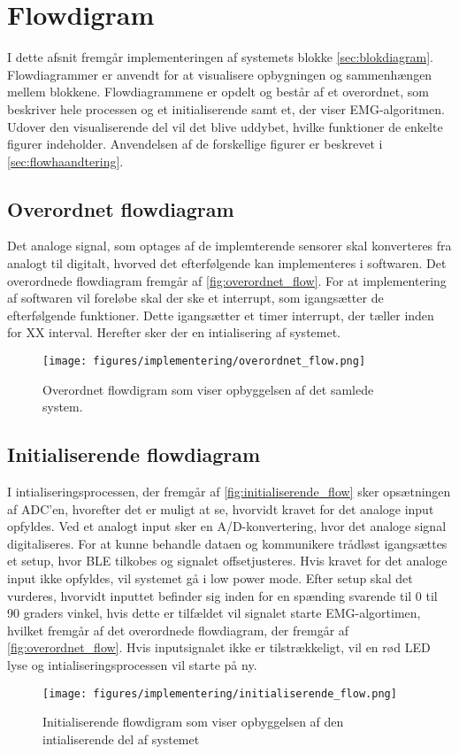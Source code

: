\section{Flowdigram}
I dette afsnit fremgår implementeringen af systemets blokke \autoref{sec:blokdiagram}. Flowdiagrammer er anvendt for at visualisere opbygningen og sammenhængen mellem blokkene. Flowdiagrammene er opdelt og består af et overordnet, som beskriver hele processen og et initialiserende samt et, der viser EMG-algoritmen. Udover den visualiserende del vil det blive uddybet, hvilke funktioner de enkelte figurer indeholder. Anvendelsen af de forskellige figurer er beskrevet i \autoref{sec:flowhaandtering}.

\subsection{Overordnet flowdiagram}
Det analoge signal, som optages af de implemterende sensorer skal konverteres fra analogt til digitalt, hvorved det efterfølgende kan implementeres i softwaren. Det overordnede flowdiagram fremgår af \autoref{fig:overordnet_flow}. For at implementering af softwaren vil foreløbe skal der ske et interrupt, som igangsætter de efterfølgende funktioner. Dette igangsætter et timer interrupt, der tæller inden for XX interval. Herefter sker der en intialisering af systemet.

\begin{figure}[H]
\centering
\texttt{[image: figures/implementering/overordnet\_flow.png]}
\caption{Overordnet flowdigram som viser opbyggelsen af det samlede system.}
\label{fig:overordnet_flow}
\end{figure}


\subsection{Initialiserende flowdiagram}
I intialiseringsprocessen, der fremgår af \autoref{fig:initialiserende_flow} sker opsætningen af ADC'en, hvorefter det er muligt at se, hvorvidt kravet for det analoge input opfyldes. Ved et analogt input sker en A/D-konvertering, hvor det analoge signal digitaliseres. For at kunne behandle dataen og kommunikere trådløst igangsættes et setup, hvor BLE tilkobes og signalet offsetjusteres. Hvis kravet for det analoge input ikke opfyldes, vil systemet gå i low power mode. Efter setup skal det vurderes, hvorvidt inputtet befinder sig inden for en spænding svarende til 0 til 90 graders vinkel, hvis dette er tilfældet vil signalet starte EMG-algortimen, hvilket fremgår af det overordnede flowdiagram, der fremgår af \autoref{fig:overordnet_flow}. Hvis inputsignalet ikke er tilstrækkeligt, vil en rød LED lyse og intialiseringsprocessen vil starte på ny. 
\begin{figure}[H]
\centering
\texttt{[image: figures/implementering/initialiserende\_flow.png]}
\caption{Initialiserende flowdigram som viser opbyggelsen af den intialiserende del af systemet}
\label{fig:initialiserende_flow}
\end{figure}

